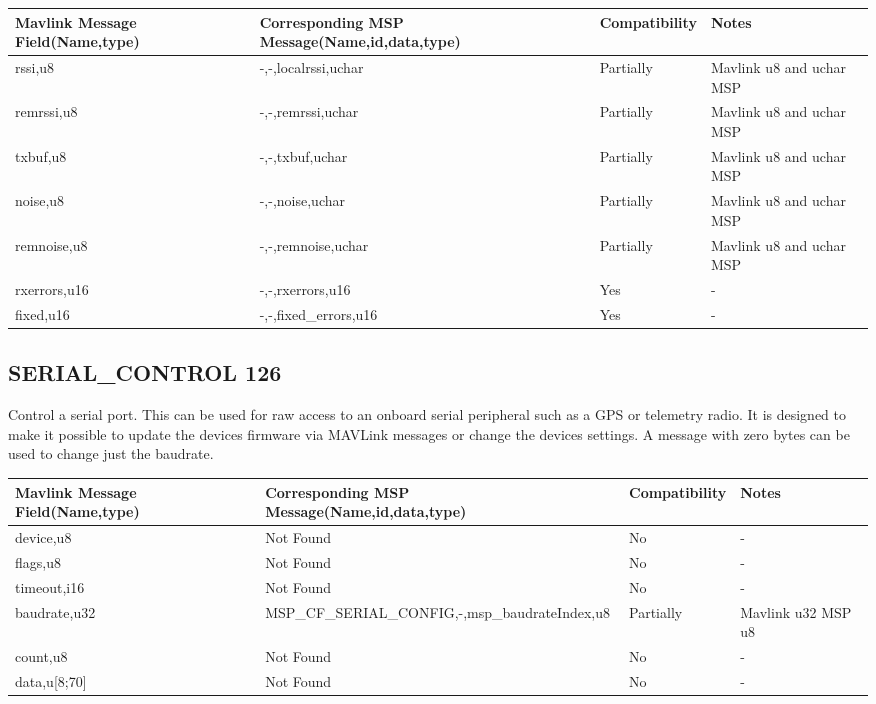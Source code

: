 {
\centering
\begin{tabular}{ |p{4cm  } |p{7cm} | p{2cm}|m{5em}|}
\hline
Mavlink Message Field(Name,type)&Corresponding MSP Message(Name,id,data,type)& Compatibility & Notes\\
\hline
\rowcolor{lightgray}
rssi,u8 & -,-,localrssi,uchar & Partially & Mavlink u8 and uchar MSP \\
\hline
\rowcolor{lightgray}
remrssi,u8 & -,-,remrssi,uchar & Partially & Mavlink u8 and uchar MSP \\
\hline
\rowcolor{lightgray}
txbuf,u8 & -,-,txbuf,uchar & Partially & Mavlink u8 and uchar MSP \\
\hline
\rowcolor{lightgray}
noise,u8& -,-,noise,uchar& Partially & Mavlink u8 and uchar MSP \\
\hline
\rowcolor{lightgray}
remnoise,u8 & -,-,remnoise,uchar& Partially & Mavlink u8 and uchar MSP \\
\hline
\rowcolor{green}
rxerrors,u16 & -,-,rxerrors,u16 & Yes & - \\
\hline
\rowcolor{green}
fixed,u16 & -,-,fixed\_errors,u16& Yes & - \\
\end{tabular}
}

\cleardoublepage


\subsection{SERIAL\_CONTROL 126 } 
Control a serial port. This can be used for raw access to an onboard serial peripheral such as a GPS or telemetry radio. It is designed to make it possible to update the devices firmware via MAVLink messages or change the devices settings. A message with zero bytes can be used to change just the baudrate.\\

{
\centering
\begin{tabular}{ |p{4cm  } |p{7cm} | p{2cm}|m{5em}|}
\hline
Mavlink Message Field(Name,type)&Corresponding MSP Message(Name,id,data,type)& Compatibility & Notes\\
\hline
device,u8 & Not Found & No & - \\
\hline
flags,u8 & Not Found & No & - \\
\hline
timeout,i16& Not Found & No & - \\
\hline
\rowcolor{lightgray}
baudrate,u32 & MSP\_CF\_SERIAL\_CONFIG,-,msp\_baudrateIndex,u8 & Partially & Mavlink u32 MSP u8 \\
\hline
count,u8 & Not Found & No & - \\
\hline
data,u[8;70] & Not Found & No & - \\
\end{tabular}
}

